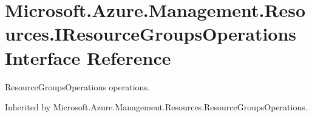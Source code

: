 \hypertarget{interface_microsoft_1_1_azure_1_1_management_1_1_resources_1_1_i_resource_groups_operations}{}\section{Microsoft.\+Azure.\+Management.\+Resources.\+I\+Resource\+Groups\+Operations Interface Reference}
\label{interface_microsoft_1_1_azure_1_1_management_1_1_resources_1_1_i_resource_groups_operations}


Resource\+Groups\+Operations operations.  




Inherited by Microsoft.\+Azure.\+Management.\+Resources.\+Resource\+Groups\+Operations.

